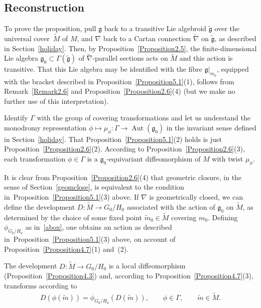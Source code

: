 \documentclass[11pt]{article}
\DeclareMathOperator{\automorphism}{Aut}
\numberwithin{equation}{section}
\begin{document}
\subsection{Reconstruction}\label{hutty}

To prove the proposition, pull ${\mathfrak g} $ back to a transitive
Lie algebroid $\tilde {\mathfrak g} $ over the universal cover~$\tilde
M$ of $M$, and $\nabla $ back to a Cartan connection $\tilde \nabla $
on $\tilde {\mathfrak g}$, as described in Section~\ref{holiday}. Then, by
Proposition~\ref{Proposition2.5}, the f\/inite-dimensional Lie algebra
${\mathfrak g}_0 \subset \Gamma(\tilde {\mathfrak g})$ of $\tilde
\nabla $-parallel sections acts on $\tilde M$ and this action is
transitive. That this Lie algebra may be identif\/ied with the f\/ibre
${\mathfrak g}|_{m_0}$, equipped with the bracket described in Proposition~\ref{Proposition5.1}(1),
follows from Remark~\ref{Remark2.6} and Proposition~\ref{Proposition2.6}(4)
(but we make no further use of this
interpretation).

Identify $\Gamma$ with the group of covering transformations and let
us understand the monodromy representation $\phi \mapsto \mu_\phi
\colon \Gamma \rightarrow \automorphism ({\mathfrak g}_0)$ in the
invariant sense def\/ined in Section~\ref{holiday}. That Proposition~\ref{Proposition5.1}(2) %
holds is
just Proposition~\ref{Proposition2.6}(2).
According to Proposition~\ref{Proposition2.6}(3),
each transformation $\phi \in \Gamma $ is a
${\mathfrak g}_0$-equivariant dif\/feomorphism of $M$ with twist
$\mu_\phi$.

It is clear from Proposition~\ref{Proposition2.6}(4)
that geometric
closure, in the sense of Section~\ref{geomclose}, is equivalent to the
condition in~Proposition~\ref{Proposition5.1}(3) %
above. If $\nabla $ is geometrically closed,
we can def\/ine the development $D \colon \tilde M \rightarrow
{G_0/H_0}$ associated with the action of ${\mathfrak g}_0$ on $\tilde
M$, as determined by the choice of some f\/ixed point $\tilde m_0 \in
\tilde M$ covering $m_0$. Def\/ining $\phi_{G_0/H_0} $ as in~\eqref{abox},
 one obtains an action as described in~Proposition~\ref{Proposition5.1}(3) %
above, on account of Proposition~\ref{Proposition4.7}(1) and~(2).  %

The development $D \colon \tilde M \rightarrow {G_0/H_0} $ is a local
dif\/feomorphism (Proposition~\ref{Proposition4.3}) %
and, according to
Proposition~\ref{Proposition4.7}(3), %
transforms according to
\begin{gather}
  D(\phi(\tilde m))=\phi_{G_0/H_0} (D(\tilde m)),
  \qquad \phi \in \Gamma,\qquad \tilde m \in \tilde M.  \label{cvg}
\end{gather}
\end{document}
